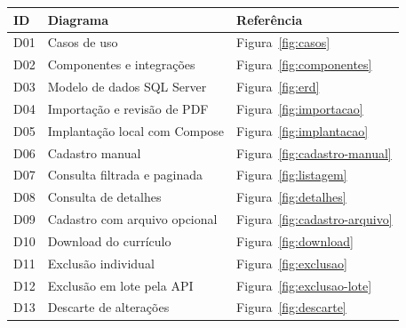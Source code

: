 \documentclass[fontsize=11pt,a4paper,oneside,parskip=half,
 headings=normal,captions=tableheading]{scrartcl}
\newcommand{\cabecalhotabela}{\rowcolor{paperblue}}
\begin{document}
\begin{tabularx}{\textwidth}{P{1cm}Y P{3.1cm}}
    \toprule\cabecalhotabela\textbf{ID} & \textbf{Diagrama}             & \textbf{Referência}               \\\midrule
    D01                                 & Casos de uso                  & Figura~\ref{fig:casos}            \\
    D02                                 & Componentes e integrações     & Figura~\ref{fig:componentes}      \\
    D03                                 & Modelo de dados SQL Server    & Figura~\ref{fig:erd}              \\
    D04                                 & Importação e revisão de PDF   & Figura~\ref{fig:importacao}       \\
    D05                                 & Implantação local com Compose & Figura~\ref{fig:implantacao}      \\
    D06                                 & Cadastro manual               & Figura~\ref{fig:cadastro-manual}  \\
    D07                                 & Consulta filtrada e paginada  & Figura~\ref{fig:listagem}         \\
    D08                                 & Consulta de detalhes          & Figura~\ref{fig:detalhes}         \\
    D09                                 & Cadastro com arquivo opcional & Figura~\ref{fig:cadastro-arquivo} \\
    D10                                 & Download do currículo         & Figura~\ref{fig:download}         \\
    D11                                 & Exclusão individual           & Figura~\ref{fig:exclusao}         \\
    D12                                 & Exclusão em lote pela API     & Figura~\ref{fig:exclusao-lote}    \\
    D13                                 & Descarte de alterações        & Figura~\ref{fig:descarte}         \\\bottomrule
\end{tabularx}


\end{document}
